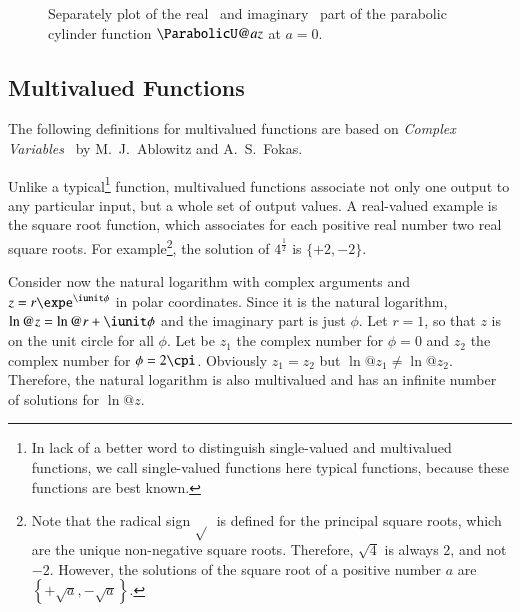 \begin{figure}[!htp]
    \centering
    \vspace{-0.1cm}
    \caption{Separately plot of the real~\protect{} and imaginary~\protect{} part of the parabolic cylinder function $\ParabolicU@{a}{z}$ at $a=0$.}
    \label{fig:cylinderUSplit}
\end{figure}

\subsection{Multivalued Functions}
The following definitions for multivalued functions are based on \textit{Complex Variables}~\cite{ComplexVariables} by M.~J.~Ablowitz and A.~S.~Fokas.

Unlike a typical\footnote{In lack of a better word to distinguish single-valued and multivalued functions, we call single-valued functions here typical functions, because these functions are best known.} function, multivalued functions associate not only one output to any particular input, but a whole set of output values. A real-valued example is the square root function, which associates for each positive real number two real square roots. For example\footnote{Note that the radical sign $\sqrt{}$\ is defined for the principal square roots, which are the unique non-negative square roots. Therefore, $\sqrt{4}$ is always $2$, and not $-2$. However, the solutions of the square root of a positive number $a$ are $\left\{+\sqrt{a},-\sqrt{a}\right\}$.}, the solution of $4^{\frac{1}{2}}$ is $\{+2,-2\}$.

Consider now the natural logarithm with complex arguments and $z = r\expe^{\iunit\phi}$ in polar coordinates. Since it is the natural logarithm, $\ln@{z} = \ln@{r} + \iunit\phi$ and the imaginary part is just $\phi$. Let $r = 1$, so that $z$ is on the unit circle for all $\phi$. Let be $z_1$ the complex number for $\phi = 0$ and $z_2$ the complex number for $\phi = 2\cpi$. Obviously $z_1 = z_2$ but $\ln@{z_1} \neq \ln@{z_2}$. Therefore, the natural logarithm is also multivalued and has an infinite number of solutions for $\ln@{z}$. 

